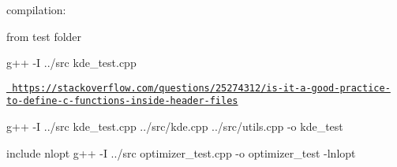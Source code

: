 compilation\+:

from test folder

g++ -\/I ../src kde\+\_\+test.\+cpp

\href{https://stackoverflow.com/questions/25274312/is-it-a-good-practice-to-define-c-functions-inside-header-files}{\texttt{ https\+://stackoverflow.\+com/questions/25274312/is-\/it-\/a-\/good-\/practice-\/to-\/define-\/c-\/functions-\/inside-\/header-\/files}}

g++ -\/I ../src kde\+\_\+test.\+cpp ../src/kde.cpp ../src/utils.cpp -\/o kde\+\_\+test

include nlopt g++ -\/I ../src optimizer\+\_\+test.\+cpp -\/o optimizer\+\_\+test -\/lnlopt 